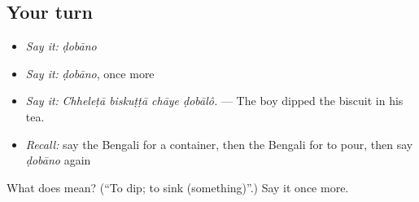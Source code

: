 \subsection*{Your turn}
\begin{itemize}
\raggedright
  \item \emph{Say it:} \emph{ḍobāno}
  \item \emph{Say it:} \emph{ḍobāno}, once more
  \item \emph{Say it:} \emph{Chheleṭā biskuṭṭā chāye ḍobālô.} — The boy dipped the biscuit in his tea.
  \item \emph{Recall:} say the Bengali for a container, then the Bengali for to pour, then say \emph{ḍobāno} again
\end{itemize}

\begin{tcolorbox}[breakable,colback=teal!4,colframe=teal!35!black,title={Before you move on}]
What does  mean? (\textquotedblleft{}To dip; to sink (something)\textquotedblright{}.) Say it once more.
\end{tcolorbox}

